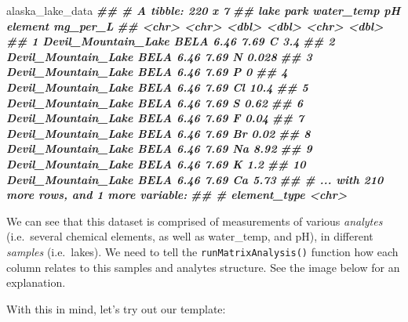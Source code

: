 \documentclass[
]{krantz}
\newenvironment{Shaded}{\begin{snugshade}}{\end{snugshade}}
\newcommand{\DocumentationTok}[1]{\textcolor[rgb]{0.56,0.35,0.01}{\textbf{\textit{#1}}}}
\newcommand{\NormalTok}[1]{#1}
\begin{document}
\begin{Shaded}
\begin{Highlighting}[]
\NormalTok{alaska\_lake\_data}
\DocumentationTok{\#\# \# A tibble: 220 x 7}
\DocumentationTok{\#\#    lake                park  water\_temp    pH element mg\_per\_L}
\DocumentationTok{\#\#    \textless{}chr\textgreater{}               \textless{}chr\textgreater{}      \textless{}dbl\textgreater{} \textless{}dbl\textgreater{} \textless{}chr\textgreater{}      \textless{}dbl\textgreater{}}
\DocumentationTok{\#\#  1 Devil\_Mountain\_Lake BELA        6.46  7.69 C          3.4  }
\DocumentationTok{\#\#  2 Devil\_Mountain\_Lake BELA        6.46  7.69 N          0.028}
\DocumentationTok{\#\#  3 Devil\_Mountain\_Lake BELA        6.46  7.69 P          0    }
\DocumentationTok{\#\#  4 Devil\_Mountain\_Lake BELA        6.46  7.69 Cl        10.4  }
\DocumentationTok{\#\#  5 Devil\_Mountain\_Lake BELA        6.46  7.69 S          0.62 }
\DocumentationTok{\#\#  6 Devil\_Mountain\_Lake BELA        6.46  7.69 F          0.04 }
\DocumentationTok{\#\#  7 Devil\_Mountain\_Lake BELA        6.46  7.69 Br         0.02 }
\DocumentationTok{\#\#  8 Devil\_Mountain\_Lake BELA        6.46  7.69 Na         8.92 }
\DocumentationTok{\#\#  9 Devil\_Mountain\_Lake BELA        6.46  7.69 K          1.2  }
\DocumentationTok{\#\# 10 Devil\_Mountain\_Lake BELA        6.46  7.69 Ca         5.73 }
\DocumentationTok{\#\# \# ... with 210 more rows, and 1 more variable:}
\DocumentationTok{\#\# \#   element\_type \textless{}chr\textgreater{}}
\end{Highlighting}
\end{Shaded}

We can see that this dataset is comprised of measurements of various \emph{analytes} (i.e.~several chemical elements, as well as water\_temp, and pH), in different \emph{samples} (i.e.~lakes). We need to tell the \texttt{runMatrixAnalysis()} function how each column relates to this samples and analytes structure. See the image below for an explanation.

With this in mind, let's try out our template:
\end{document}
